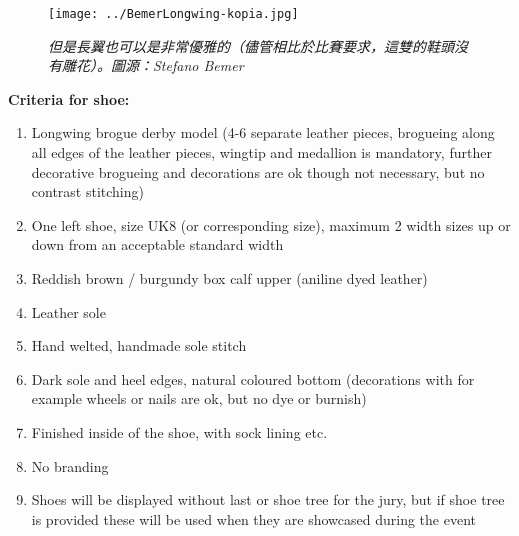 \begin{paracol}{2}
    \switchcolumn
    \begin{figure}[h]
        \centering
        \texttt{[image: ../BemerLongwing-kopia.jpg]}
        \captionsetup{labelformat=empty}
        \caption{\textit{但是長翼也可以是非常優雅的（儘管相比於比賽要求，這雙的鞋頭沒有雕花）。圖源：\textnormal{{\tnr Stefano Bemer}}}}
        \label{}
    \end{figure}


    \switchcolumn*

    \bgroup\obeylines

        \textbf{Criteria for shoe:}
        \begin{enumerate}
            \item Longwing brogue derby model (4-6 separate leather pieces, brogueing along all edges of the leather pieces, wingtip and medallion is mandatory, further decorative brogueing and decorations are ok though not necessary, but no contrast stitching)
            \item One left shoe, size UK8 (or corresponding size), maximum 2 width sizes up or down from an acceptable standard width
            \item Reddish brown / burgundy box calf upper (aniline dyed leather)
            \item Leather sole
            \item Hand welted, handmade sole stitch
            \item Dark sole and heel edges, natural coloured bottom (decorations with for example wheels or nails are ok, but no dye or burnish)
            \item Finished inside of the shoe, with sock lining etc.
            \item No branding
            \item Shoes will be displayed without last or shoe tree for the jury, but if shoe tree is provided these will be used when they are showcased during the event
        \end{enumerate}

        \newpage


\end{paracol}
